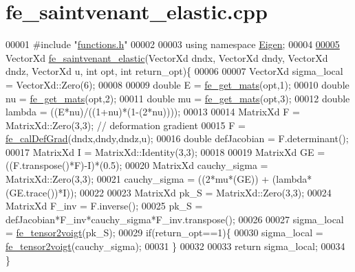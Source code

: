 \hypertarget{fe__saintvenant__elastic_8cpp_source}{}\section{fe\+\_\+saintvenant\+\_\+elastic.\+cpp}
\label{fe__saintvenant__elastic_8cpp_source}

\begin{DoxyCode}
00001 \textcolor{preprocessor}{#include "\hyperlink{functions_8h}{functions.h}"}
00002 
00003 \textcolor{keyword}{using namespace }\hyperlink{namespace_eigen}{Eigen};
00004 
\hyperlink{fe__saintvenant__elastic_8cpp_af2a970e883d0c4a7ad750547c07c5f24}{00005} VectorXd \hyperlink{fe__saintvenant__elastic_8cpp_af2a970e883d0c4a7ad750547c07c5f24}{fe\_saintvenant\_elastic}(VectorXd dndx, VectorXd dndy, VectorXd dndz, VectorXd
       u, \textcolor{keywordtype}{int} opt, \textcolor{keywordtype}{int} return\_opt)\{
00006     
00007     VectorXd sigma\_local = VectorXd::Zero(6);
00008 
00009     \textcolor{keywordtype}{double} E = \hyperlink{functions_8h_af7ffbad6dfcc99fc88b130c1a7b1720a}{fe\_get\_mats}(opt,1);
00010     \textcolor{keywordtype}{double} nu = \hyperlink{functions_8h_af7ffbad6dfcc99fc88b130c1a7b1720a}{fe\_get\_mats}(opt,2);
00011     \textcolor{keywordtype}{double} mu = \hyperlink{functions_8h_af7ffbad6dfcc99fc88b130c1a7b1720a}{fe\_get\_mats}(opt,3);
00012     \textcolor{keywordtype}{double} lambda = ((E*nu)/((1+nu)*(1-(2*nu))));
00013 
00014     MatrixXd F = MatrixXd::Zero(3,3); \textcolor{comment}{// deformation gradient}
00015     F = \hyperlink{functions_8h_ae50379f74802347e04dbc022897f9cb0}{fe\_calDefGrad}(dndx,dndy,dndz,u);
00016     \textcolor{keywordtype}{double} defJacobian = F.determinant();
00017     MatrixXd I = MatrixXd::Identity(3,3);
00018 
00019     MatrixXd GE = ((F.transpose()*F)-I)*(0.5);
00020     MatrixXd cauchy\_sigma = MatrixXd::Zero(3,3);
00021     cauchy\_sigma = ((2*mu*(GE)) + (lambda*(GE.trace())*I));
00022 
00023     MatrixXd pk\_S = MatrixXd::Zero(3,3);
00024     MatrixXd F\_inv = F.inverse();
00025     pk\_S = defJacobian*F\_inv*cauchy\_sigma*F\_inv.transpose();
00026 
00027     sigma\_local = \hyperlink{functions_8h_a73c4523ec7068af2af9e8431021f5fdf}{fe\_tensor2voigt}(pk\_S); 
00029     \textcolor{keywordflow}{if}(return\_opt==1)\{
00030         sigma\_local = \hyperlink{functions_8h_a73c4523ec7068af2af9e8431021f5fdf}{fe\_tensor2voigt}(cauchy\_sigma); 
00031     \}
00032 
00033     \textcolor{keywordflow}{return} sigma\_local;
00034 \}
\end{DoxyCode}
